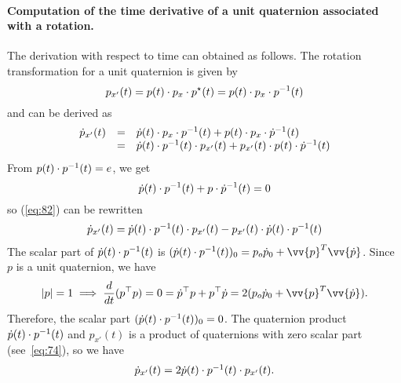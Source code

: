 \paragraph{Computation of the time derivative of a unit  quaternion associated with a rotation.}
The derivation with respect to time can obtained as follows. The rotation transformation for a unit quaternion is given by
\begin{equation}
  \label{eq:82}
  p_{x'}(t) = p(t) \cdot p_x \cdot p^\star(t) =  p(t) \cdot p_x \cdot p^{-1}(t)
\end{equation}
and can be derived as
\begin{equation}
  \label{eq:83}
  \begin{array}{lcl}
    \dot p_{x'}(t) &=& \dot p(t) \cdot p_x \cdot p^{-1}(t) + p(t) \cdot p_x \cdot \dot p^{-1}(t) \\
                  &=& \dot p(t) \cdot p^{-1}(t)  \cdot   p_{x'}(t)  +      p_{x'}(t) \cdot p(t)  \cdot \dot p^{-1}(t)    
  \end{array}
\end{equation}
From $p(t) \cdot p^{-1}(t) =e$, we get
\begin{equation}
  \label{eq:84}
  \dot p(t) \cdot p^{-1}(t) + p \cdot \dot p^{-1}(t) = 0
\end{equation}
so (\ref{eq:82}) can be rewritten
\begin{equation}
  \label{eq:85}
  \begin{array}{lcl}
    \dot p_{x'}(t) = \dot p(t) \cdot p^{-1}(t)   \cdot   p_{x'}(t)  -    p_{x'}(t) \cdot  \dot p(t) \cdot p^{-1}(t)
  \end{array}
\end{equation}
The scalar part of $\dot p(t) \cdot p^{-1}(t)$ is $(\dot p(t) \glaw p^{-1}(t))_0 = p_o \dot p_0 + \vv{p}^T\vv{\dot p}$. Since $p$ is a unit quaternion, we have
\begin{equation}
  \label{eq:86}
  |p|=1 \implies \frac{d}{dt} (p^\top p) = 0 =  \dot p^\top p + p^\top \dot p =   2( p_o \dot p_0 + \vv{p}^T\vv{\dot p}).
\end{equation}
Therefore, the scalar part $(\dot p(t) \cdot p^{-1}(t))_0 =0$.
The quaternion product $\dot p(t) \cdot p^{-1}(t)$ and  $p_{x'}(t)$ is a product of quaternions with zero scalar part (see~\eqref{eq:74}), so we have 
\begin{equation}
  \label{eq:87}
  \begin{array}{lcl}
    \dot p_{x'}(t) = 2 \dot p(t) \cdot p^{-1}(t)   \cdot p_{x'}(t).
  \end{array}
\end{equation}

